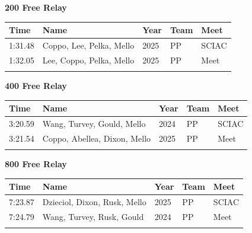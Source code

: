 \vspace{1.2em}
\noindent\begin{minipage}[t]{0.98\textwidth}
\centering
\textbf{\textcolor{teamprimary}{200 Free Relay}}\par
\vspace{0.5em}
\centering
\small
\renewcommand{\arraystretch}{1.0}
\setlength{\tabcolsep}{4pt}
\begin{tabular}{@{}p{2.7cm}p{4.3cm}p{1.6cm}p{2.7cm}p{2.7cm}@{}}
\toprule
\textbf{Time} & \textbf{Name} & \textbf{Year} & \textbf{Team} & \textbf{Meet} \\
\midrule
1:31.48 & Coppo, Lee, Pelka, Mello & 2025 & PP & SCIAC \\
1:32.05 & Lee, Coppo, Pelka, Mello & 2025 & PP & Meet \\
\bottomrule
\vspace{0.5em}
\end{tabular}
\end{minipage}
\vspace{1.2em}
\noindent\begin{minipage}[t]{0.98\textwidth}
\centering
\textbf{\textcolor{teamprimary}{400 Free Relay}}\par
\vspace{0.5em}
\centering
\small
\renewcommand{\arraystretch}{1.0}
\setlength{\tabcolsep}{4pt}
\begin{tabular}{@{}p{2.7cm}p{4.3cm}p{1.6cm}p{2.7cm}p{2.7cm}@{}}
\toprule
\textbf{Time} & \textbf{Name} & \textbf{Year} & \textbf{Team} & \textbf{Meet} \\
\midrule
3:20.59 & Wang, Turvey, Gould, Mello & 2024 & PP & SCIAC \\
3:21.54 & Coppo, Abellea, Dixon, Mello & 2025 & PP & Meet \\
\bottomrule
\vspace{0.5em}
\end{tabular}
\end{minipage}
\vspace{1.2em}
\noindent\begin{minipage}[t]{0.98\textwidth}
\centering
\textbf{\textcolor{teamprimary}{800 Free Relay}}\par
\vspace{0.5em}
\centering
\small
\renewcommand{\arraystretch}{1.0}
\setlength{\tabcolsep}{4pt}
\begin{tabular}{@{}p{2.7cm}p{4.3cm}p{1.6cm}p{2.7cm}p{2.7cm}@{}}
\toprule
\textbf{Time} & \textbf{Name} & \textbf{Year} & \textbf{Team} & \textbf{Meet} \\
\midrule
7:23.87 & Dzieciol, Dixon, Rusk, Mello & 2025 & PP & SCIAC \\
7:24.79 & Wang, Turvey, Rusk, Gould & 2024 & PP & Meet \\
\bottomrule
\vspace{0.5em}
\end{tabular}
\end{minipage}
